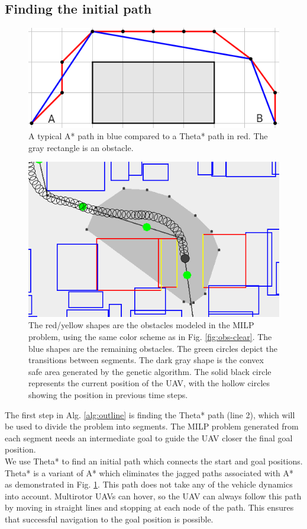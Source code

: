 \subsection{Finding the initial path}
\begin{figure}
    \centering
        \includegraphics[width=0.65\columnwidth]{img/a_theta_star_comp3}
    \caption{A typical A* path in blue compared to a Theta* path in red. The gray rectangle is an obstacle.}\label{fig:pre-comp}
\end{figure}

\begin{figure}[!t]
    \centering
        \includegraphics[width=0.7\columnwidth]{img/pre-full}
    \caption{The red/yellow shapes are the obstacles modeled in the MILP problem, using the same color scheme as in Fig. \ref{fig:obs-clear}. The blue shapes are the remaining obstacles. The green circles depict the transitions between segments. The dark gray shape is the convex safe area generated by the genetic algorithm. The solid black circle represents the current position of the UAV, with the hollow circles showing the position in previous time steps.}\label{fig:pre-full}
\end{figure}
The first step in Alg. \ref{alg:outline} is finding the Theta* path (line 2), which will be used to divide the problem into segments. The MILP problem generated from each segment needs an intermediate goal to guide the UAV closer the final goal position.\\
We use Theta* \cite{Daniel2010} to find an initial path which connects the start and goal positions. Theta* is a variant of A* which eliminates the jagged paths associated with A* as demonstrated in Fig. \ref{fig:pre-comp}.
This path does not take any of the vehicle dynamics into account. Multirotor UAVs can hover, so the UAV can always follow this path by moving in straight lines and stopping at each node of the path. This ensures that successful navigation to the goal position is possible.\\

